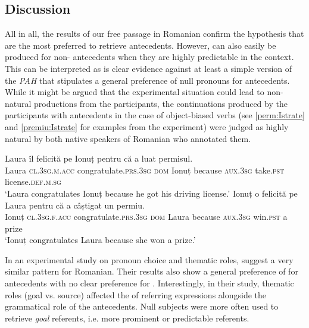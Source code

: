 \documentclass[output=paper,colorlinks,citecolor=brown]{langscibook}
\begin{document}
\subsection {Discussion} 
All in all, the results of our free passage  in Romanian confirm the hypothesis that  are the most preferred  to retrieve  antecedents. However,  can also easily be produced for non- antecedents when they are highly predictable in the context. 
This can be interpreted as is clear evidence against at least a simple version of the \textit{PAH} \citep{carminati2002processing} that stipulates a general preference of null  pronouns for  antecedents. While it might be argued that the experimental situation could lead to non-natural productions from the participants, the continuations produced by the participants with  antecedents in the case of object-biased verbs (see \ref{perm:Istrate} and \ref{premiu:Istrate} for examples from the experiment) were judged as highly natural by both native speakers of Romanian who annotated them.

\ea
\ea \gll Laura îl felicită pe Ionuț {pentru că} a luat permisul.\\
Laura \textsc{cl.3sg.m.acc} congratulate.\textsc{prs.3sg} \textsc{dom} Ionuț because \textsc{aux.3sg} take.\textsc{pst} license.\textsc{def.m.sg}\\
\glt 
`Laura congratulates Ionuț because he got his driving license.’ \label{perm:Istrate}
\ex \gll Ionuț o felicită pe Laura {pentru că} a câștigat un permiu.\\
Ionuț \textsc{cl.3sg.f.acc} congratulate.\textsc{prs.3sg} \textsc{dom} Laura because    \textsc{aux.3sg} win.\textsc{pst} a prize\\
\glt `Ionuț congratulates Laura because she won a prize.’ \label{premiu:Istrate}
\z \z


In an experimental study on pronoun choice and thematic roles, \citet{lindemann2020thematic} suggest a very similar pattern for Romanian. Their results also show a general preference of  for  antecedents with no clear preference for . Interestingly, in their study, thematic roles (goal vs. source) affected the  of referring expressions alongside the grammatical role of the antecedents. Null subjects were more often used to retrieve \textit{goal} referents, i.e. more prominent or predictable referents.
\end{document}
